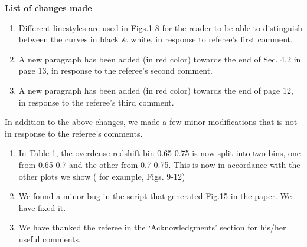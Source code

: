 \documentclass[english]{letter}
\begin{document}
{\bf List of changes made}
\begin{enumerate}
\item Different linestyles are used in Figs.1-8 for the reader to be able to distinguish between the curves in black \& white, in response to referee's first comment.
\item A new paragraph has been added (in red color) towards the end of Sec. 4.2 in page 13, in response to the referee's second comment.
\item A new paragraph has been added (in red color) towards the end of page 12, in response to the referee's third comment. \\
\end{enumerate}

In addition to the above changes, we made a few minor modifications that is not in response to the referee's comments. \\

\begin{enumerate}\addtocounter{enumi}{3}
\item In Table 1, the overdense redshift bin 0.65-0.75 is now split into two bins, one from 0.65-0.7 and the other from 0.7-0.75. This is now in accordance
      with the other plots we show ( for example, Figs. 9-12)
\item We found a minor bug in the script that generated Fig.15 in the paper. We have fixed it.
\item We have thanked the referee in the `Acknowledgments' section for his/her useful comments.
\end{enumerate}
\end{document}
